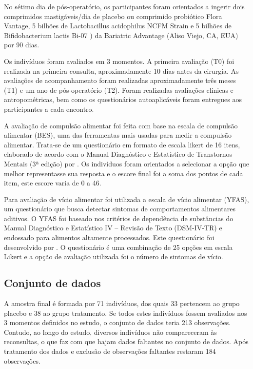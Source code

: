 No sétimo dia de pós-operatório, os participantes foram orientados a ingerir dois comprimidos mastigáveis/dia de placebo ou comprimido probiótico Flora Vantage, 5 bilhões de Lactobacillus acidophilus NCFM \textregistered Strain e 5 bilhões de Bifidobacterium lactis Bi-07 \textregistered) da Bariatric Advantage (Aliso Viejo, CA, EUA) por 90 dias.

Os indivíduos foram avaliados em 3 momentos. A primeira avaliação (T0) foi realizada na primeira consulta, aproximadamente 10 dias antes da cirurgia. As avaliações de acompanhamento foram realizadas aproximadamente três meses (T1) e um ano de pós-operatório (T2). Foram realizadas avaliações clínicas e antropométricas, bem como os questionários autoaplicáveis foram entregues aos participantes a cada encontro.

A avaliação de compulsão alimentar foi feita com base na escala de compulsão alimentar (BES), uma das ferramentas mais usadas para medir a compulsão alimentar. Trata-se de um questionário em formato de escala likert de 16 itens, elaborado de acordo com o Manual Diagnóstico e Estatístico de Transtornos Mentais (3ª edição) \citep{spitzer1980diagnostic} por \citet{gormally1982assessment}. Os indivíduos foram orientados a selecionar a opção que melhor representasse sua resposta e o escore final foi a soma dos pontos de cada item, este escore varia de 0 a 46.

Para avaliação de vício alimentar foi utilizada a escala de vício alimentar (YFAS), um questionário que busca detectar sintomas de comportamentos alimentares aditivos. O YFAS foi baseado nos critérios de dependência de substâncias do Manual Diagnóstico e Estatístico IV – Revisão de Texto (DSM-IV-TR) \citep{segal2010diagnostic} e endossado para alimentos altamente processados. Este questionário foi desenvolvido por \citet{gearhardt2009preliminary}. O questionário é uma combinação de 25 opções em escala Likert e a opção de avaliação utilizada foi o número de sintomas de vício.


\subsection{Conjunto de dados}

A amostra final é formada por 71 indivíduos, dos quais 33 pertencem ao grupo placebo e 38 ao grupo tratamento. Se todos estes indivíduos fossem avaliados nos 3 momentos definidos no estudo, o conjunto de dados teria 213 observações. Contudo, ao longo do estudo, diversos indivíduos não compareceram às reconsultas, o que faz com que hajam dados faltantes no conjunto de dados. Após tratamento dos dados e exclusão de observações faltantes restaram 184 observações.

